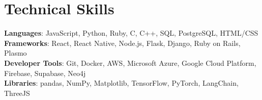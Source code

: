 \documentclass[letterpaper,11pt]{article}
\begin{document}
\section{Technical Skills}
 \begin{itemize}[leftmargin=0.15in, label={}]
    \small{\item{
     \textbf{Languages}{: JavaScript, Python, Ruby, C, C++, SQL, PostgreSQL, HTML/CSS} \\
     \textbf{Frameworks}{: React, React Native, Node.js, Flask, Django, Ruby on Rails, Plasmo} \\
     \textbf{Developer Tools}{: Git, Docker, AWS, Microsoft Azure, Google Cloud Platform, Firebase, Supabase, Neo4j} \\
     \textbf{Libraries}{: pandas, NumPy, Matplotlib, TensorFlow, PyTorch, LangChain, ThreeJS}
    }}
 \end{itemize}

\end{document}

